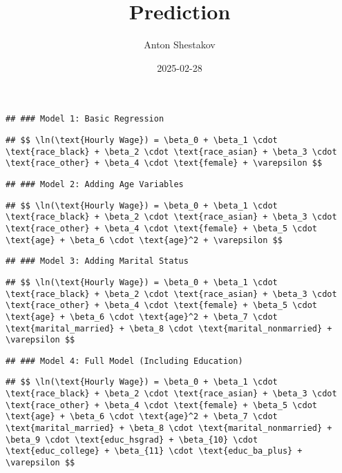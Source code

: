 \documentclass[
]{article}
\title{Prediction}
\author{Anton Shestakov}
\date{2025-02-28}
\begin{document}
\maketitle

\begin{verbatim}
## ### Model 1: Basic Regression
\end{verbatim}

\begin{verbatim}
## $$ \ln(\text{Hourly Wage}) = \beta_0 + \beta_1 \cdot \text{race_black} + \beta_2 \cdot \text{race_asian} + \beta_3 \cdot \text{race_other} + \beta_4 \cdot \text{female} + \varepsilon $$
\end{verbatim}

\begin{verbatim}
## ### Model 2: Adding Age Variables
\end{verbatim}

\begin{verbatim}
## $$ \ln(\text{Hourly Wage}) = \beta_0 + \beta_1 \cdot \text{race_black} + \beta_2 \cdot \text{race_asian} + \beta_3 \cdot \text{race_other} + \beta_4 \cdot \text{female} + \beta_5 \cdot \text{age} + \beta_6 \cdot \text{age}^2 + \varepsilon $$
\end{verbatim}

\begin{verbatim}
## ### Model 3: Adding Marital Status
\end{verbatim}

\begin{verbatim}
## $$ \ln(\text{Hourly Wage}) = \beta_0 + \beta_1 \cdot \text{race_black} + \beta_2 \cdot \text{race_asian} + \beta_3 \cdot \text{race_other} + \beta_4 \cdot \text{female} + \beta_5 \cdot \text{age} + \beta_6 \cdot \text{age}^2 + \beta_7 \cdot \text{marital_married} + \beta_8 \cdot \text{marital_nonmarried} + \varepsilon $$
\end{verbatim}

\begin{verbatim}
## ### Model 4: Full Model (Including Education)
\end{verbatim}

\begin{verbatim}
## $$ \ln(\text{Hourly Wage}) = \beta_0 + \beta_1 \cdot \text{race_black} + \beta_2 \cdot \text{race_asian} + \beta_3 \cdot \text{race_other} + \beta_4 \cdot \text{female} + \beta_5 \cdot \text{age} + \beta_6 \cdot \text{age}^2 + \beta_7 \cdot \text{marital_married} + \beta_8 \cdot \text{marital_nonmarried} + \beta_9 \cdot \text{educ_hsgrad} + \beta_{10} \cdot \text{educ_college} + \beta_{11} \cdot \text{educ_ba_plus} + \varepsilon $$
\end{verbatim}
\end{document}
